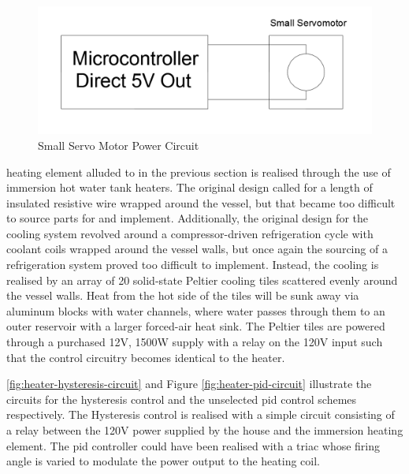 \documentclass{article}
\begin{document}
\begin{figure}[H]
\begin{center}
\includegraphics[scale=0.20]{servo-small-actuator-circuit.png}
\caption{Small Servo Motor Power Circuit}
\label{fig:servo-small-actuator-circuit}
\end{center}
\end{figure}

 heating element alluded to in the previous section is realised through the use of immersion hot water tank heaters. The original design called for a length of insulated resistive wire wrapped around the vessel, but that became too difficult to source parts for and implement. Additionally, the original design for the cooling system revolved around a compressor-driven refrigeration cycle with coolant coils wrapped around the vessel walls, but once again the sourcing of a refrigeration system proved too difficult to implement. Instead, the cooling is realised by an array of 20 solid-state Peltier cooling tiles scattered evenly around the vessel walls. Heat from the hot side of the tiles will be sunk away via aluminum blocks with water channels, where water passes through them to an outer reservoir with a larger forced-air heat sink. The Peltier tiles are powered through a purchased 12V, 1500W supply with a relay on the 120V input such that the control circuitry becomes identical to the heater.

 \ref{fig:heater-hysteresis-circuit} and Figure \ref{fig:heater-pid-circuit} illustrate the circuits for the hysteresis control and the unselected \gls{pid} control schemes respectively. The Hysteresis control is realised with a simple circuit consisting of a relay between the 120V power supplied by the house and the immersion heating element. The \gls{pid} controller could have been realised with a triac whose firing angle is varied to modulate the power output to the heating coil.
\end{document}

